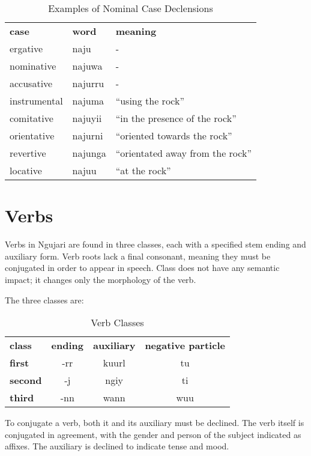 \begin{table}[h]
\centering
\begin{tabular}{lll}
\textbf{case} & \textbf{word} & \textbf{meaning}\\
ergative & naju & -\\
nominative & najuwa & -\\
accusative & najurru & -\\
instrumental & najuma & ``using the rock''\\
comitative & najuyii & ``in the presence of the rock''\\
orientative & najurni & ``oriented towards the rock''\\
revertive & najunga & ``orientated away from the rock''\\
locative & najuu & ``at the rock''\\
\end{tabular}
\caption{Examples of Nominal Case Declensions}
\end{table}

\section{Verbs}

Verbs in Ngujari are found in three classes, each with a specified stem ending
and auxiliary form. Verb roots lack a final consonant, meaning they must be
conjugated in order to appear in speech. Class does not have any semantic
impact; it changes only the morphology of the verb.

The three classes are:

\begin{table}[h]
\centering
\begin{tabular}{lccc}
\textbf{class} & \textbf{ending} & \textbf{auxiliary} & \textbf{negative particle}\\
\textbf{first} & -rr & kuurl & tu\\
\textbf{second} & -j & ngiy & ti\\
\textbf{third} & -nn & wann & wuu\\
\end{tabular}
\caption{Verb Classes}
\end{table}

To conjugate a verb, both it and its auxiliary must be declined. The verb itself
is conjugated in agreement, with the gender and person of the subject indicated
as affixes. The auxiliary is declined to indicate tense and mood.

